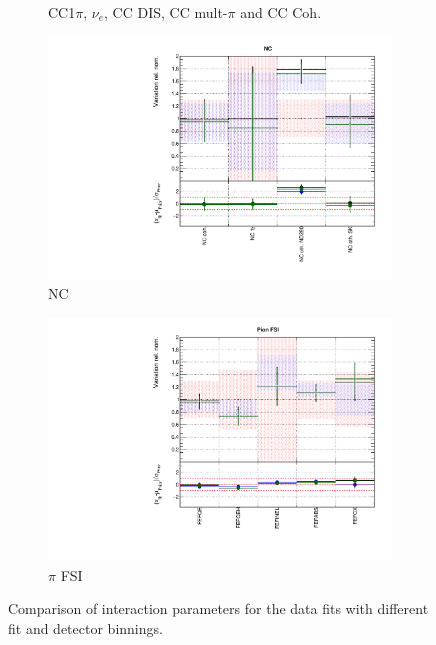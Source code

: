 \begin{figure}
\begin{subfigure}{0.49\textwidth}
  \caption{CC1$\pi$, $\nu_e$, CC DIS, CC mult-$\pi$ and CC Coh.}
\end{subfigure}
\begin{subfigure}{0.49\textwidth}
  \centering
  \includegraphics[width=0.9\linewidth]{figs/polydataxsec_4}
  \caption{NC}
\end{subfigure}
\begin{subfigure}{0.49\textwidth}
  \centering
  \includegraphics[width=0.9\linewidth]{figs/polydataxsec_5}
  \caption{$\pi$ FSI}
\end{subfigure}
\caption{Comparison of interaction parameters for the data fits with different fit and detector binnings.}
\label{fig:polydataxsec}
\end{figure}

